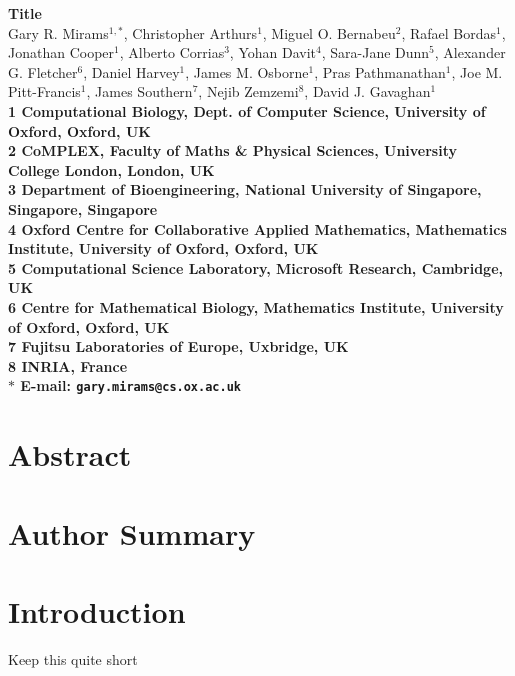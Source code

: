 \documentclass[10pt]{article}
\date{}
\begin{document}
\begin{flushleft}
{\Large
\textbf{Title}
}
\\
Gary R. Mirams$^{1,\ast}$, Christopher Arthurs$^{1}$, Miguel O. Bernabeu$^{2}$, 
Rafael Bordas$^{1}$, Jonathan Cooper$^{1}$, Alberto Corrias$^3$, Yohan Davit$^4$, 
Sara-Jane Dunn$^5$, Alexander G. Fletcher$^6$, Daniel Harvey$^{1}$, 
James M. Osborne$^{1}$, Pras Pathmanathan$^{1}$, Joe M. Pitt-Francis$^{1}$, 
James Southern$^7$, Nejib Zemzemi$^8$, David J. Gavaghan$^{1}$
\\
\bf{1} Computational Biology, Dept. of Computer Science, University of Oxford, Oxford, UK
\\
\bf{2} CoMPLEX, Faculty of Maths \& Physical Sciences, University College London, London, UK
\\
\bf{3} Department of Bioengineering, National University of Singapore, Singapore, Singapore
\\
\bf{4} Oxford Centre for Collaborative Applied Mathematics, Mathematics Institute, University of Oxford, Oxford, UK
\\
\bf{5} Computational Science Laboratory, Microsoft Research, Cambridge, UK
\\
\bf{6} Centre for Mathematical Biology, Mathematics Institute, University of Oxford, Oxford, UK
\\
\bf{7} Fujitsu Laboratories of Europe, Uxbridge, UK
\\
\bf{8} INRIA, France
\\
$\ast$ E-mail: \texttt{gary.mirams@cs.ox.ac.uk}
\end{flushleft}

\section*{Abstract}

\section*{Author Summary}

\section*{Introduction}

Keep this quite short
\end{document}
